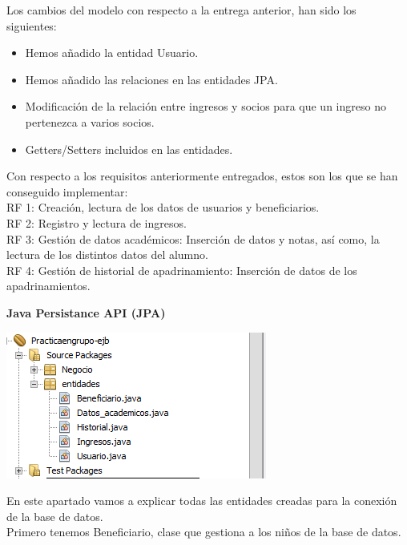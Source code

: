 \documentclass{article}
\begin{document}
Los cambios del modelo con respecto a la entrega anterior, han sido los siguientes: 

\begin{itemize}
\item Hemos añadido la entidad Usuario.
\item Hemos añadido las relaciones en las entidades JPA.
\item Modificación de la relación entre ingresos y socios para que un ingreso no pertenezca a varios socios.
\item Getters/Setters incluidos en las entidades.
\end{itemize}

Con respecto a los requisitos anteriormente entregados, estos son los que se han conseguido implementar:\\
RF 1: Creación, lectura de los datos de usuarios y beneficiarios.\\
RF 2: Registro y lectura de ingresos.\\
RF 3: Gestión de datos académicos: Inserción de datos y notas, así como, la lectura de los distintos datos del alumno.\\
RF 4: Gestión de historial de apadrinamiento: Inserción de datos de los apadrinamientos.\\

\newpage

\textbf{Java Persistance API (JPA)}

\begin{center}
\includegraphics[scale=0.5]{images/tree.png}
\end{center}

En este apartado vamos a explicar todas las entidades creadas para la conexión de la base de datos.\\
Primero tenemos Beneficiario, clase que gestiona a los niños de la base de datos.
\end{document}

